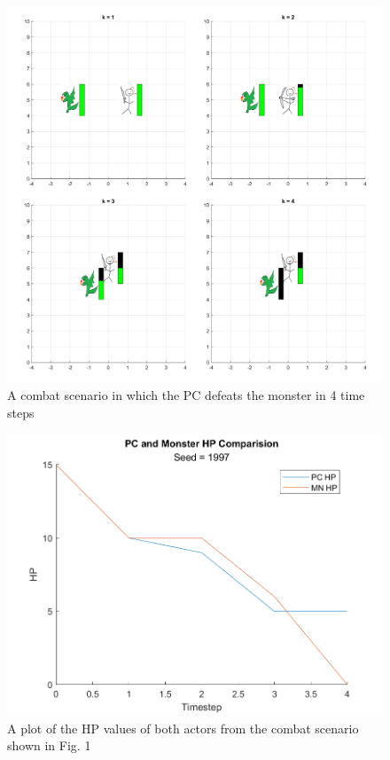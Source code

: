 \documentclass[letterpaper, 10 pt, conference]{ieeeconf}
\begin{document}
\begin{figure}[h]
\centering
\includegraphics[scale = 0.2]{figs/DND_SingleSim_Animation_rng_seed=1997.png}
\caption{A combat scenario in which the PC defeats the monster in 4 time steps}
\label{fig:single_sim_animation_1997}
\end{figure}

\begin{figure}[h]
    \centering
    \includegraphics[scale = 0.5]{figs/DND_SingleSim_HPcomp_rng_seed=1997.png}
    \caption{A plot of the HP values of both actors from the combat scenario shown in Fig. 1}
    \label{fig:single_sim_hpcomp_1997}
    \end{figure}
\end{document}
